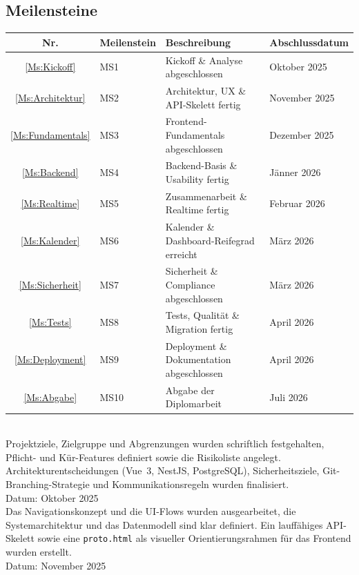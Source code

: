  
\subsection{Meilensteine}
 
\begin{tabular*}{\textwidth}{c l p{6cm} l}
    \toprule
    Nr. & Meilenstein & Beschreibung & Abschlussdatum \\
    \midrule\midrule
    \ref{Ms:Kickoff}      & MS1  & Kickoff \& Analyse abgeschlossen          & Oktober 2025  \\
    \ref{Ms:Architektur}  & MS2  & Architektur, UX \& API-Skelett fertig     & November 2025 \\
    \ref{Ms:Fundamentals} & MS3  & Frontend-Fundamentals abgeschlossen       & Dezember 2025 \\
    \ref{Ms:Backend}      & MS4  & Backend-Basis \& Usability fertig         & J\"{a}nner 2026   \\
    \ref{Ms:Realtime}     & MS5  & Zusammenarbeit \& Realtime fertig         & Februar 2026  \\
    \ref{Ms:Kalender}     & MS6  & Kalender \& Dashboard-Reifegrad erreicht  & M\"{a}rz 2026     \\
    \ref{Ms:Sicherheit}   & MS7  & Sicherheit \& Compliance abgeschlossen    & M\"{a}rz 2026     \\
    \ref{Ms:Tests}        & MS8  & Tests, Qualit\"{a}t \& Migration fertig       & April 2026    \\
    \ref{Ms:Deployment}   & MS9  & Deployment \& Dokumentation abgeschlossen & April 2026    \\
    \ref{Ms:Abgabe}       & MS10 & Abgabe der Diplomarbeit                   & Juli 2026     \\
    \bottomrule
\end{tabular*}
\\[1.5em]
 
\label{Ms:Kickoff}
Projektziele, Zielgruppe und Abgrenzungen wurden schriftlich festgehalten, Pflicht- und Kür-Features definiert sowie die Risikoliste angelegt. Architekturentscheidungen (Vue~3, NestJS, PostgreSQL), Sicherheitsziele, Git-Branching-Strategie und Kommunikationsregeln wurden finalisiert.\\
Datum: Oktober 2025\\
 
\label{Ms:Architektur}
Das Navigationskonzept und die UI-Flows wurden ausgearbeitet, die Systemarchitektur und das Datenmodell sind klar definiert. Ein lauffähiges API-Skelett sowie eine \texttt{proto.html} als visueller Orientierungsrahmen für das Frontend wurden erstellt.\\
Datum: November 2025\\
 
